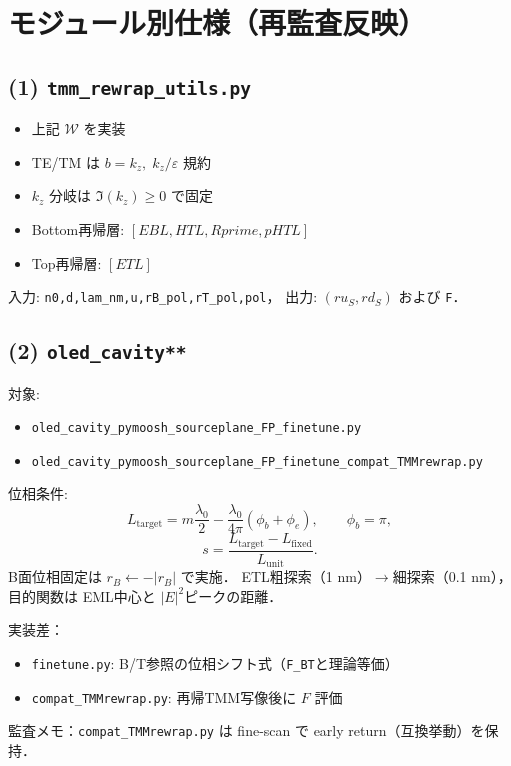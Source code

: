 \documentclass[a4paper,11pt]{article}
\begin{document}
\section{モジュール別仕様（再監査反映）}

\subsection{(1) \texttt{tmm\_rewrap\_utils.py}}
\begin{itemize}[leftmargin=1.5em]
\item 上記 \(\mathcal W\) を実装
\item TE/TM は \(b=k_z,\;k_z/\varepsilon\) 規約
\item \(k_z\) 分岐は \(\Im(k_z)\ge 0\) で固定
\item Bottom再帰層: \([EBL,HTL,Rprime,pHTL]\)
\item Top再帰層: \([ETL]\)
\end{itemize}
入力: \texttt{n0,d,lam\_nm,u,rB\_pol,rT\_pol,pol}，
出力: \((ru_S,rd_S)\) および \texttt{F}．

\subsection{(2) \texttt{oled\_cavity**}}
対象:
\begin{itemize}[leftmargin=1.5em]
\item \texttt{oled\_cavity\_pymoosh\_sourceplane\_FP\_finetune.py}
\item \texttt{oled\_cavity\_pymoosh\_sourceplane\_FP\_finetune\_compat\_TMMrewrap.py}
\end{itemize}

位相条件:
\[
L_{\mathrm{target}}=m\frac{\lambda_0}{2}
-\frac{\lambda_0}{4\pi}(\phi_b+\phi_e),\qquad \phi_b=\pi,
\]
\[
s=\frac{L_{\mathrm{target}}-L_{\mathrm{fixed}}}{L_{\mathrm{unit}}}.
\]
B面位相固定は \(r_B\leftarrow-|r_B|\) で実施．
ETL粗探索（1 nm）\(\to\)細探索（0.1 nm），
目的関数は EML中心と \(|E|^2\)ピークの距離．

実装差：
\begin{itemize}[leftmargin=1.5em]
\item \texttt{finetune.py}: B/T参照の位相シフト式（\texttt{F\_BT}と理論等価）
\item \texttt{compat\_TMMrewrap.py}: 再帰TMM写像後に \(F\) 評価
\end{itemize}

監査メモ：\texttt{compat\_TMMrewrap.py} は fine-scan で early return（互換挙動）を保持．
\end{document}
